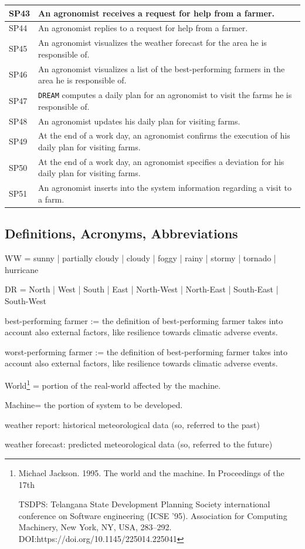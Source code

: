 \documentclass{article}
\begin{document}
\begin{longtable}[c]{|m{0.75cm}|m{11cm}|}
 \hline
 SP43 & An agronomist receives a request for help from a farmer.\\
 \hline
 SP44 & An agronomist replies to a request for help from a farmer.\\
 \hline
 SP45 & An agronomist visualizes the weather forecast for the area he is responsible of.\\
 \hline
 SP46 & An agronomist visualizes a list of the best-performing farmers in the area he is responsible of.\\
 \hline
 SP47 & \verb|DREAM| computes a daily plan  for an agronomist to visit the farms he is responsible of.\\
 \hline
 SP48 & An agronomist updates his daily plan for visiting farms.\\
 \hline
 SP49 & At the end of a work day, an agronomist confirms the execution of his daily plan for visiting farms.\\
 \hline
 SP50 & At the end of a work day, an agronomist specifies a deviation for his daily plan for visiting farms.\\
 \hline
 SP51 & An agronomist inserts into the system information regarding a visit to a farm.\\
 \hline
 \end{longtable}

\subsection{Definitions, Acronyms, Abbreviations}\label{Abbreviations}
\begin{itemize}
    \item WW = sunny | partially cloudy |  cloudy | foggy  |  rainy | stormy | tornado | hurricane
    \item DR = North | West | South | East | North-West | North-East | South-East | South-West 
    \item best-performing farmer := the definition of best-performing farmer takes into account also external factors, like resilience towards climatic adverse events.
    \item worst-performing farmer := the definition of best-performing farmer takes into account also external factors, like resilience towards climatic adverse events.
    \item World\footnote{{Michael Jackson. 1995. The world and the machine. In Proceedings of the 17th
    \item TSDPS: Telangana State Development Planning Society
international conference on Software engineering (ICSE '95). Association for
Computing Machinery, New York, NY, USA, 283–292.
DOI:https://doi.org/10.1145/225014.225041}} = portion of the real-world
affected by the machine.
\item Machine\footnotemark[10] = the portion of system to be developed.
\item weather report: historical meteorological data (so, referred to the past)
\item weather forecast: predicted meteorological data (so, referred to the future) 
\end{itemize}
\end{document}
